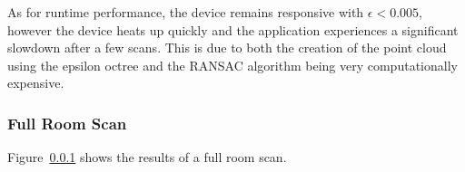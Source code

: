 As for runtime performance, the device remains responsive with $\epsilon<0.005$, however the device heats
up quickly and the application experiences a significant slowdown after a few scans.
This is due to both the creation of the point cloud using the epsilon octree and the RANSAC algorithm being
very computationally expensive.

\subsubsection{Full Room Scan}

Figure~\ref{} shows the results of a full room scan.

